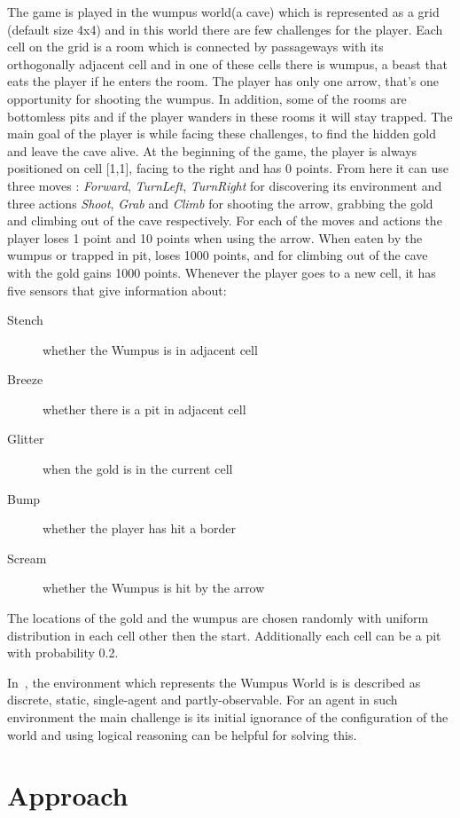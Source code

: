 \documentclass{llncs}
\begin{document}
The game is played in the wumpus world(a cave) which is represented as a grid (default size 4x4) and in this world there are few challenges for the player. Each cell on the grid is a room which is connected by passageways with its orthogonally adjacent cell and in one of these cells there is wumpus, a beast that eats the player if he enters the room. The player has only one arrow, that's one opportunity for shooting the wumpus. In addition, some of the rooms are bottomless pits and if the player wanders in these rooms it will stay trapped. The main goal of the player is while facing these challenges, to find the hidden gold and leave the cave alive. At the beginning of the game, the player is always positioned on cell [1,1], facing to the right and has 0 points. From here it can use three moves : \emph{Forward}, \emph{TurnLeft}, \emph{TurnRight} for discovering its environment and three actions \emph{Shoot}, \emph{Grab} and \emph{Climb} for shooting the arrow, grabbing the gold and climbing out of the cave respectively. For each of the moves and actions the player loses 1 point and 10 points when using the arrow. When eaten by the wumpus or trapped in pit, loses 1000 points, and for climbing out of the cave with the gold gains 1000 points. Whenever the player goes to a new cell, it has five sensors that give information about:
\begin{description}
	\item[Stench]{whether the Wumpus is in adjacent cell}
	\item[Breeze]{whether there is a pit in adjacent cell}
	\item[Glitter]{when the gold is in the current cell}
	\item[Bump]{whether the player has hit a border}
	\item[Scream]{whether the Wumpus is hit by the arrow}
\end{description}
The locations of the gold and the wumpus are chosen randomly with uniform distribution in each cell other then the start. Additionally each cell can be a pit with probability 0.2.

In~\cite{book:aima}, the environment which represents the Wumpus World is is described as discrete, static, single-agent and partly-observable. For an agent in such environment the main challenge is its initial ignorance of the configuration of the world and using logical reasoning can be helpful for solving this. 

\section{Approach}
\end{document}
